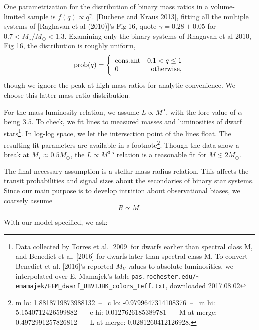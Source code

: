 \documentclass{emulateapj}
\begin{document}
One parametrization for the distribution of 
binary mass ratios in a volume-limited sample is $f(q)\propto q^\gamma$.
[Duchene and Kraus 2013], fitting all the multiple systems of [Raghavan et al 
(2010)]'s Fig 16, quote $\gamma = 0.28\pm0.05$ for $0.7<M_\star/M_\odot<1.3$.
Examining only the binary systems of Rhagavan et al 2010, Fig 16, the 
distribution is roughly uniform,
\begin{equation}
{\rm prob}(q) =
\Bigg\{\begin{array}{lr}
{\rm constant} & 0.1 < q \leq 1  \\
0 & {\rm otherwise},
\end{array}
\label{eq:mass_ratio}
\end{equation}
though we ignore the peak at high mass ratios for analytic convenience. 
We choose this latter mass ratio distribution.

For the mass-luminosity relation, %
we assume 
$L \propto M^\alpha$, with the lore-value of $\alpha$ being $3.5$.
To check, we fit lines to measured masses and luminosities of dwarf 
stars\footnote{
    Data collected by Torres et al. [2009] for dwarfs earlier than 
    spectral class M, and Benedict et al. [2016] for dwarfs later than 
    spectral class M.
    To convert Benedict et al. [2016]'s reported $M_V$ values to absolute 
    luminosities, we interpolated over E. Mamajek's 
    table
	\texttt{pas.rochester.edu/\textasciitilde 
		emamajek/EEM\_dwarf\_UBVIJHK\_colors\_Teff.txt},
	downloaded 2017.08.02}.
In log-log space, we let the intersection point of the lines float. The 
resulting fit parameters are available in a footnote\footnote{
	m lo: 1.8818719873988132~--~
	c lo: -0.9799647314108376~--~
	m hi: 5.1540712426599882~--~
	c hi: 0.0127626185389781~--~
	M at merge: 0.4972991257826812~--~
	L at merge: 0.0281260412126928.
}. Though the data show a break at $M_\star \approx 0.5M_\odot$, the 
$L\propto M^{3.5}$ relation is a reasonable fit for $M\lesssim 2M_\odot$.

The final necessary assumption is a stellar mass-radius relation.
This affects the transit probabilities and signal sizes about the 
secondaries of binary star systems.
Since our main purpose is to develop intuition about observational 
biases, we coarsely assume
\begin{equation}
R\propto M.
\end{equation}

With our model specified, we ask:
\end{document}
